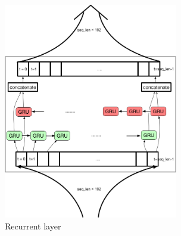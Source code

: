 \begin{figure}[H] 
	\centering
	\includegraphics[width=3in]{Figures/rnn_layer}
	\caption[Recurrent layer]{Recurrent layer}
	\label{fig:rnn_layer}
\end{figure}


